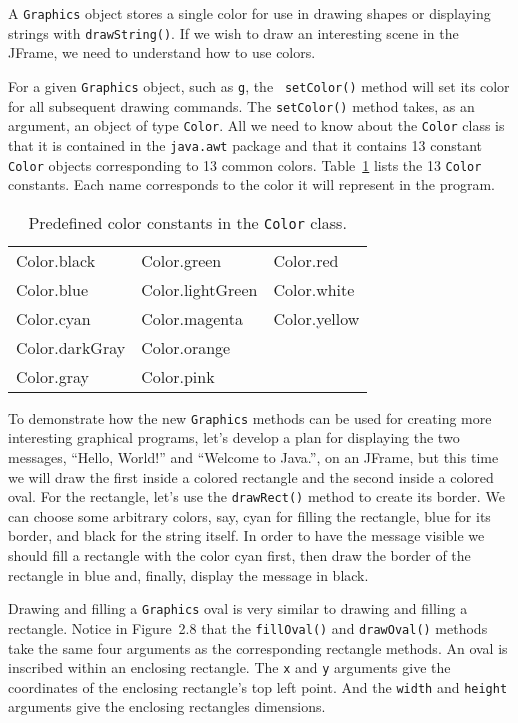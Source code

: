 A {\tt Graphics} object stores a single color for use in drawing
shapes or displaying strings with {\tt drawString()}.  If we wish to
draw an interesting scene in the JFrame, we need to understand
how to use colors.

For a given {\tt Graphics} object, such as {\tt g}, the {\tt
setColor()} method will set its color for all subsequent drawing
commands.  The {\tt setColor()} method takes, as an argument, an
object of type {\tt Color}.  All we need to know about the {\tt Color}
class is that it is contained in the {\tt java.awt} package and that
it contains 13 constant {\tt Color} objects corresponding to 13 common
colors.  Table~\ref{table-colors} lists the 13 {\tt Color}
constants. Each name corresponds to the color it will represent in the
program.

\begin{center}
\begin{table}[h]
\centering
\begin{tabular}{|l|l|l|} \hline
  Color.black & Color.green  & Color.red \\
  Color.blue & Color.lightGreen  & Color.white \\
  Color.cyan & Color.magenta  & Color.yellow \\
  Color.darkGray & Color.orange  &  \\
  Color.gray & Color.pink  &  \\ \hline
\end{tabular}
\caption{Predefined color constants in the {\tt Color} class.}
\label{table-colors}
\end{table}
\end{center}

To demonstrate how the new {\tt Graphics} methods can be used for
creating more interesting graphical programs, let's develop a plan for displaying
the two messages, ``Hello, World!'' and ``Welcome to Java.'', on an
JFrame, but this time we will draw the first inside a colored
rectangle and the second inside a colored oval. For the rectangle,
let's use the {\tt drawRect()} method to create its border.  We can
choose some arbitrary colors, say, cyan for filling the rectangle,
blue for its border, and black for the string itself. In order to have the
message visible we should fill a rectangle with the color cyan first,
then draw the border of the rectangle in blue and, finally, display
the message in black.

Drawing and filling a {\tt Graphics} oval is very similar to drawing
and filling a rectangle. Notice in Figure~2.8 that the
{\tt fillOval()} and {\tt drawOval()} methods take the same four
arguments as the corresponding rectangle methods.  An oval is
inscribed within an enclosing rectangle. The {\tt x} and {\tt y}
arguments give the coordinates of the enclosing rectangle's top left
point. And the {\tt width} and {\tt height} arguments give the
enclosing rectangles dimensions.

